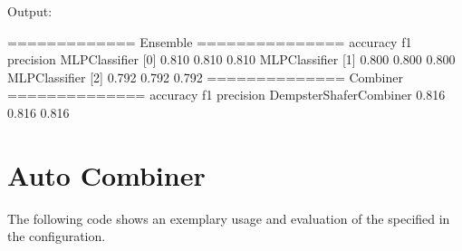 \documentclass[letterpaper,10pt,english]{sphinxmanual}
\begin{document}
\sphinxAtStartPar
Output:

\begin{sphinxVerbatim}[commandchars=\\\{\}]
============= Ensemble ===============
                                     accuracy     f1  precision
MLPClassifier [0]                       0.810  0.810      0.810
MLPClassifier [1]                       0.800  0.800      0.800
MLPClassifier [2]                       0.792  0.792      0.792
============== Combiner ==============
                                     accuracy     f1  precision
DempsterShaferCombiner                  0.816  0.816      0.816
\end{sphinxVerbatim}


\section{Auto Combiner}
\label{\detokenize{usage_and_examples:auto-combiner}}
\sphinxAtStartPar
The following code shows an exemplary usage and evaluation of the {\hyperref[\detokenize{pusion.auto.auto_combiner:ac-cref}]{}} specified in
the configuration.

\begin{sphinxVerbatim}[commandchars=\\\{\}]
  
 
  

  
 

\end{sphinxVerbatim}
\end{document}
